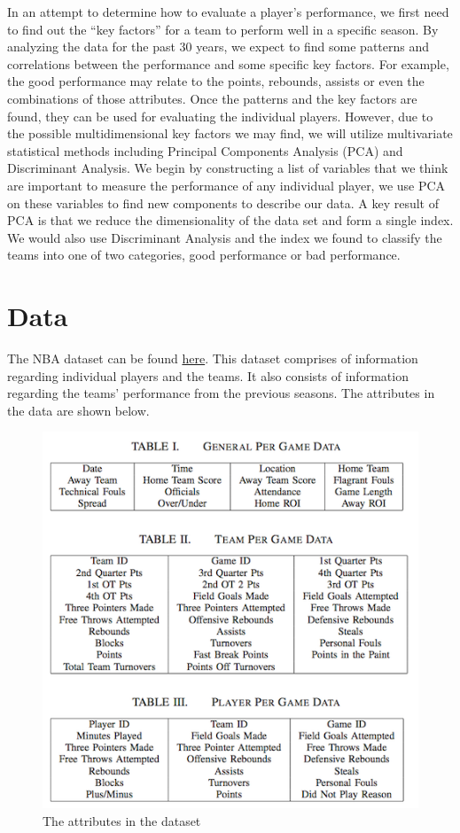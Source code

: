 \documentclass{acm_proc_article-sp}
\begin{document}
In an attempt to determine how to evaluate a player's performance, we first need to find out the ``key factors'' for a team to perform well in a specific season. By analyzing the data for the past 30 years, we expect to find some patterns and correlations between the performance and some specific key factors. For example, the good performance may relate to the points, rebounds, assists or even the combinations of those attributes. Once the patterns and the key factors are found, they can be used for evaluating the individual players. However, due to the possible multidimensional key factors we may find, we will utilize multivariate statistical methods including Principal Components Analysis (PCA) and Discriminant Analysis. We begin by constructing a list of variables that we think are important to measure the performance of any individual player, we use PCA on these variables to find new components to describe our data. A key result of PCA is that we reduce the dimensionality of the data set and form a single index. We would also use Discriminant Analysis and the index we found to classify the teams into one of two categories, good performance or bad performance.

\section{Data}
The NBA dataset can be found \href{http://www.basketball-reference.com/teams/}{here}. This dataset comprises of information regarding individual players and the teams. It also consists of information regarding the teams' performance from the previous seasons. The attributes in the data are shown below.

\begin{figure}[!htb]
\includegraphics{attributes.png}
\caption{The attributes in the dataset}
\end{figure}
\end{document}
